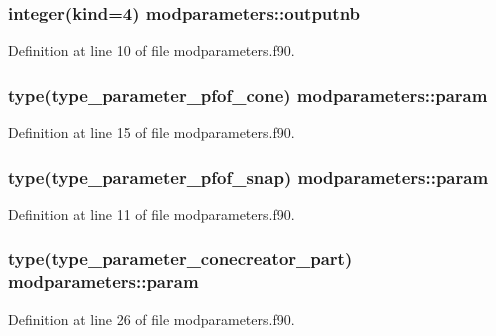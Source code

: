 \hypertarget{classmodparameters_af9c51fea2e80f26e50d7543bbe12add7}{
\subsubsection[{outputnb}]{\setlength{\rightskip}{0pt plus 5cm}integer(kind=4) modparameters\-::outputnb}}\label{classmodparameters_af9c51fea2e80f26e50d7543bbe12add7}


Definition at line 10 of file modparameters.\-f90.

\hypertarget{classmodparameters_a32546175bce08b1ac34285f2ccbcab42}{
\subsubsection[{param}]{\setlength{\rightskip}{0pt plus 5cm}type(type\-\_\-parameter\-\_\-pfof\-\_\-cone) modparameters\-::param}}\label{classmodparameters_a32546175bce08b1ac34285f2ccbcab42}


Definition at line 15 of file modparameters.\-f90.

\hypertarget{classmodparameters_a5bc8037f0b9d0512a3270e202301c149}{
\subsubsection[{param}]{\setlength{\rightskip}{0pt plus 5cm}type(type\-\_\-parameter\-\_\-pfof\-\_\-snap) modparameters\-::param}}\label{classmodparameters_a5bc8037f0b9d0512a3270e202301c149}


Definition at line 11 of file modparameters.\-f90.

\hypertarget{classmodparameters_abc02ba22055134e4f7e714d0cc521f61}{
\subsubsection[{param}]{\setlength{\rightskip}{0pt plus 5cm}type(type\-\_\-parameter\-\_\-conecreator\-\_\-part) modparameters\-::param}}\label{classmodparameters_abc02ba22055134e4f7e714d0cc521f61}


Definition at line 26 of file modparameters.\-f90.

